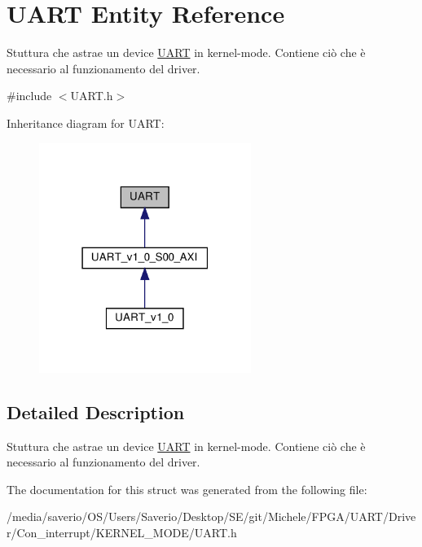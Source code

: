 \hypertarget{structUART}{}\section{U\+A\+RT Entity Reference}
\label{structUART}


Stuttura che astrae un device \hyperlink{structUART}{U\+A\+RT} in kernel-\/mode. Contiene ciò che è necessario al funzionamento del driver.  




{\ttfamily \#include $<$U\+A\+R\+T.\+h$>$}



Inheritance diagram for U\+A\+RT\+:
\nopagebreak
\begin{figure}[H]
\begin{center}
\leavevmode
\includegraphics[width=195pt]{structUART__inherit__graph}
\end{center}
\end{figure}


\subsection{Detailed Description}
Stuttura che astrae un device \hyperlink{structUART}{U\+A\+RT} in kernel-\/mode. Contiene ciò che è necessario al funzionamento del driver. 

The documentation for this struct was generated from the following file\+:\begin{DoxyCompactItemize}
\item 
/media/saverio/\+O\+S/\+Users/\+Saverio/\+Desktop/\+S\+E/git/\+Michele/\+F\+P\+G\+A/\+U\+A\+R\+T/\+Driver/\+Con\+\_\+interrupt/\+K\+E\+R\+N\+E\+L\+\_\+\+M\+O\+D\+E/U\+A\+R\+T.\+h\end{DoxyCompactItemize}
